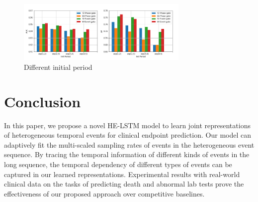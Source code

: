 \documentclass[letterpaper]{article} %
\begin{document}
\begin{figure}[!t]
\centering
\includegraphics[width=0.9810000000000001\linewidth,height=1.17in ]{init_period.png}

\caption{Different initial period}

\label{fig:period}
\end{figure}







\section{Conclusion}
In this paper, we propose a novel HE-LSTM model
to learn joint representations of heterogeneous temporal events for clinical endpoint prediction.
Our model can adaptively fit the multi-scaled sampling rates of events in the heterogeneous event sequence. By tracing the temporal information of different kinds of events in the long sequence, the temporal dependency of different types of events can be captured in our learned representations.
Experimental results with real-world clinical data on the tasks of predicting death and abnormal lab tests prove the effectiveness of our proposed approach over competitive baselines.

\vspace{-0.91mm}
\vspace{-2.38mm}
\end{document}
